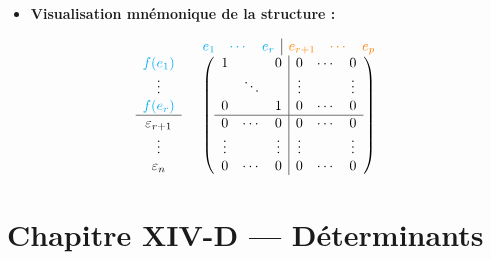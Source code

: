 \documentclass[11pt, a4paper]{article}
\theoremstyle{definition}
\begin{document}
\begin{itemize}
\begin{itemize}
\item On calcule les coordonnées des images $f(e_j)$ exprimées dans la base $C$ pour remplir les colonnes de la matrice :
\begin{itemize}
\item \textbf{Bloc Gauche ($j \in [\!|1, r|\!]$) :} Chaque $f(e_j)$ est par construction le $j$-ième vecteur de la base $C$. Ses coordonnées forment la matrice identité $I_r$ complétée par des zéros en dessous.
\item \textbf{Bloc Droit ($j \in [\!|r+1, p|\!]$) :} Chaque $e_j$ appartenant au noyau, $f(e_j) = 0_F$. Ses coordonnées génèrent des colonnes entièrement nulles.
\end{itemize}
\end{itemize}
\item \textbf{Visualisation mnémonique de la structure :}
\end{itemize}

\[
\begin{array}{cc} & \begin{array}{ccc|ccc} \color{cyan}e_1 & \color{cyan}\cdots & \color{cyan}e_r & \color{orange}e_{r+1} & \color{orange}\cdots & \color{orange}e_p \end{array} \\ \begin{array}{c} \color{cyan}f(e_1) \\ \vdots \\ \color{cyan}f(e_r) \\ \hline \varepsilon_{r+1} \\ \vdots \\ \varepsilon_n \end{array} & \left( \begin{array}{ccc|ccc} 1 & & 0 & 0 & \cdots & 0 \\ & \ddots & & \vdots & & \vdots \\ 0 & & 1 & 0 & \cdots & 0 \\ \hline 0 & \cdots & 0 & 0 & \cdots & 0 \\ \vdots & & \vdots & \vdots & & \vdots \\ 0 & \cdots & 0 & 0 & \cdots & 0 \end{array} \right) \end{array}
\]

\clearpage

\section{Chapitre XIV-D --- Déterminants}
\end{document}

